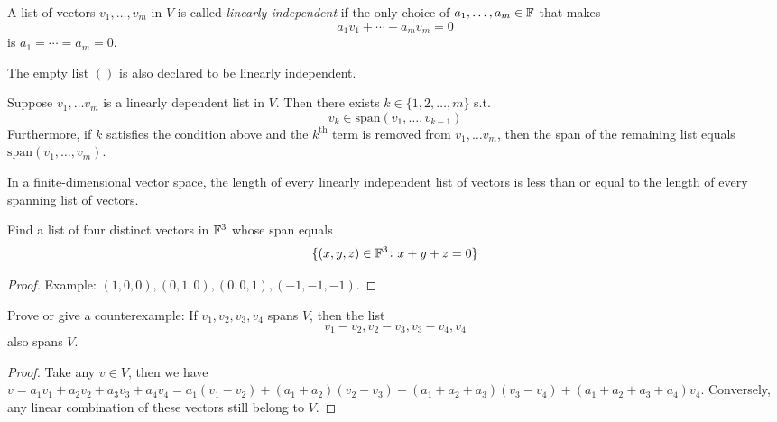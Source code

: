 \documentclass{extarticle}
\begin{document}
\begin{definition}
    A list of vectors \(v_1, \ldots, v_m\) in \(V\) is called \emph{linearly independent}
    if the only choice of \(a_1, \ldots, a_m \in \mathbb{F}\) that makes 
    \[a_1v_1 + \cdots + a_m v_m = 0\]
    is \(a_1 = \cdots = a_m = 0\). 

    The empty list \(()\) is also declared to be linearly independent.
\end{definition}

\begin{lemma}
    Suppose \(v_1, \ldots v_m\) is a linearly dependent list in \(V\). Then 
    there exists \(k \in \{1, 2, \ldots, m\}\) s.t. 
    \[v_k \in \text{span}(v_1, \ldots, v_{k-1})\]
    Furthermore, if \(k\) satisfies the condition above and the \(k^{\text{th}}\)
    term is removed from \(v_1, \ldots v_m\), then the span of the remaining list 
    equals \(\text{span}(v_1, \ldots, v_m)\).
\end{lemma}

\begin{lemma}
    In a finite-dimensional vector space, the length of every linearly independent 
    list of vectors is less than or equal to the length of every spanning 
    list of vectors. 
\end{lemma}

\newpage 
{}
\begin{problem}{1}
    Find a list of four distinct vectors in \(\mathbb{F}^3\) whose span equals 
    \[\{(x, y, z) \in \mathbb{F}^3 \colon x + y + z =0\}\]
\end{problem}

\begin{proof}
Example: \((1, 0, 0), (0, 1, 0), (0, 0, 1), (-1, -1, -1)\). 
\end{proof}

\begin{problem}{2}
    Prove or give a counterexample: If \(v_1, v_2, v_3, v_4\) spans \(V\), then 
    the list 
    \[v_1 - v_2, v_2 - v_3, v_3 - v_4, v_4\]
    also spans \(V\).
\end{problem}

\begin{proof}
Take any \(v \in V\), then we have \(v = a_1 v_1 + a_2 v_2 + a_3 v_3 
+ a_4 v_4 = a_1(v_1 - v_2) + (a_1 + a_2) (v_2 - v_3) + (a_1 + a_2 + a_3)(
    v_3 - v_4) + (a_1 + a_2 +a_3 + a_4) v_4\). Conversely, any linear combination 
    of these vectors still belong to \(V\).
\end{proof}
\end{document}
